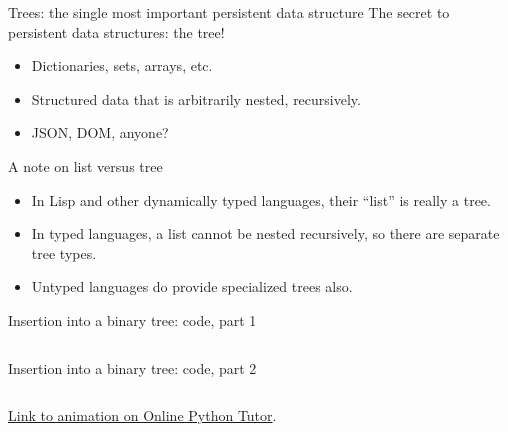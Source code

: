 \begin{frame}{Trees: the single most important persistent data structure}
  The secret to persistent data structures: the tree!
  \begin{itemize}
  \item Dictionaries, sets, arrays, etc.
  \item Structured data that is arbitrarily nested, recursively.
  \item JSON, DOM, anyone?
  \end{itemize}

  \begin{alertblock}{A note on list versus tree}
    \begin{itemize}
    \item In Lisp and other dynamically typed languages, their ``list'' is really a tree.
    \item In typed languages, a list cannot be nested recursively, so
      there are separate tree types.
    \item Untyped languages do provide specialized trees also.
    \end{itemize}
  \end{alertblock}
\end{frame}


\begin{frame}[fragile]{Insertion into a binary tree: code, part 1}
  \inputminted{python}{trees1.py}
\end{frame}

\begin{frame}[fragile]{Insertion into a binary tree: code, part 2}
  \inputminted{python}{trees2.py}

\href{http://www.pythontutor.com/visualize.html#code=def+node(left,+value,+right%29%3A%0A++++return+(left,+value,+right%29%0A%0Adef+insert(x,+tree%29%3A%0A++++if+tree+is+None%3A%0A++++++++return+node(None,+x,+None%29%0A++++else%3A%0A++++++++left,+value,+right+%3D+tree%0A++++++++if+x+%3C+value%3A%0A++++++++++++return+node(insert(x,+left%29,+value,+right%29%0A++++++++elif+x+%3E+value%3A%0A++++++++++++return+node(left,+value,+insert(x,+right%29%29%0A++++++++else%3A%0A++++++++++++return+tree%0A++++++++++++%0Atree1+%3D+node(node(node(None,+1,+None%29,%0A++++++++++++++++++2,%0A++++++++++++++++++node(None,+3,+None%29%29,%0A+++++++++++++5,%0A+++++++++++++node(node(None,+6,+None%29,%0A++++++++++++++++++7,%0A++++++++++++++++++None%29%29++++++++++++%0A++++++++++++++++++%0Atree2+%3D+insert(4,+tree1%29&mode=display&origin=opt-frontend.js&cumulative=false&heapPrimitives=false&textReferences=false&py=2&rawInputLstJSON=%5B%5D&curInstr=64}{Link to animation on Online Python Tutor}.
\end{frame}

